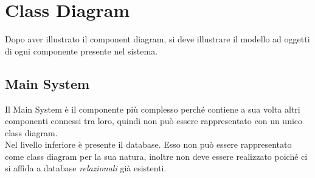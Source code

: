\section{Class Diagram}
Dopo aver illustrato il component diagram, si deve illustrare il modello ad oggetti di ogni componente presente nel sistema.


\subsection{Main System}
Il Main System è il componente più complesso perché contiene a sua volta altri componenti connessi tra loro, quindi non può essere rappresentato con un unico class diagram. 
\\Nel livello inferiore è presente il database. Esso non può essere rappresentato come class diagram per la sua natura, inoltre non deve essere realizzato poiché ci si affida a database \textit{relazionali} già esistenti.

